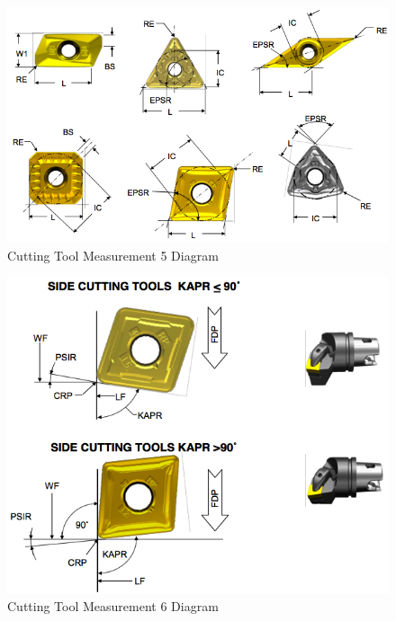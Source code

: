 \FloatBarrier


\begin{figure}[ht]
  \centering
    \includegraphics[width=1.0\textwidth]{figures/Cutting Tool Measurement 5.png}
  \caption{Cutting Tool Measurement 5 Diagram}
  \label{fig:Cutting Tool Measurement 5 Diagram}
\end{figure}

\FloatBarrier


\begin{figure}[ht]
  \centering
    \includegraphics[width=1.0\textwidth]{figures/Cutting Tool Measurement 6.png}
  \caption{Cutting Tool Measurement 6 Diagram}
  \label{fig:Cutting Tool Measurement 6 Diagram}
\end{figure}

